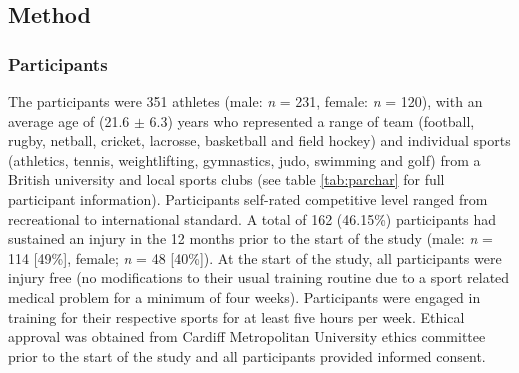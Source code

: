 \documentclass[
  english,
  man,floatsintext]{apa6}
\begin{document}
\newpage

\hypertarget{method}{%
\subsection{Method}\label{method}}

\hypertarget{participants-1}{%
\subsubsection{Participants}\label{participants-1}}

The participants were 351 athletes (male: \emph{n} = 231, female: \emph{n} = 120), with an average age of (21.6 \(\pm\) 6.3) years who represented a range of team (football, rugby, netball, cricket, lacrosse, basketball and field hockey) and individual sports (athletics, tennis, weightlifting, gymnastics, judo, swimming and golf) from a British university and local sports clubs (see table \ref{tab:parchar} for full participant information).
Participants self-rated competitive level ranged from recreational to international standard.
A total of 162 (46.15\%) participants had sustained an injury in the 12 months prior to the start of the study (male: \emph{n} = 114 {[}49\%{]}, female; \emph{n} = 48 {[}40\%{]}).
At the start of the study, all participants were injury free (no modifications to their usual training routine due to a sport related medical problem for a minimum of four weeks).
Participants were engaged in training for their respective sports for at least five hours per week.
Ethical approval was obtained from Cardiff Metropolitan University ethics committee prior to the start of the study and all participants provided informed consent.
\end{document}
